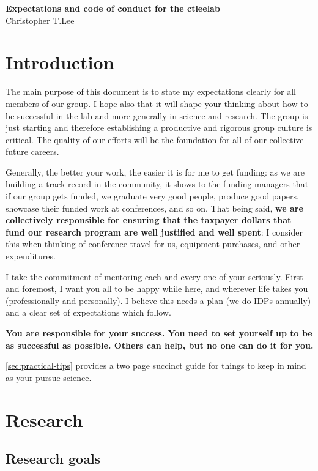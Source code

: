 \documentclass[12pt]{article}
\newenvironment{tightcenter}{%
  \setlength\topsep{0pt}
  \setlength\parskip{0pt}
  \begin{center}
}{%
  \end{center}
}
\begin{document}
\begin{tightcenter}
  \textbf{Expectations and code of conduct for the ctleelab}\\
  Christopher T.\@ Lee
\end{tightcenter}
\vspace{0.5cm}
\tableofcontents

\newpage

\section{Introduction}

The main purpose of this document is to state my expectations clearly for all members of our group.
I hope also that it will shape your thinking about how to be successful in the lab and more generally in science and research.
The group is just starting and therefore establishing a productive and rigorous group culture is critical.
The quality of our efforts will be the foundation for all of our collective future careers.

Generally, the better your work, the easier it is for me to get funding: as we are building a track record in the community, it shows to the funding managers that if our group gets funded, we graduate very good people, produce good papers, showcase their funded work at conferences, and so on.
That being said, \textbf{we are collectively responsible for ensuring that the taxpayer dollars that fund our research program are well justified and well spent}: I consider this when thinking of conference travel for us, equipment purchases, and other expenditures.

I take the commitment of mentoring each and every one of your seriously.
First and foremost, I want you all to be happy while here, and wherever life takes you (professionally and personally).
I believe this needs a plan (we do \glspl{IDP} annually) and a clear set of expectations which follow.

\textbf{You are responsible for your success.
  You need to set yourself up to be as successful as possible.
  Others can help, but no one can do it for you.
}

\cref{sec:practical-tips} provides a two page succinct guide for things to keep in mind as your pursue science.

\section{Research}
\subsection{Research goals}
\end{document}
